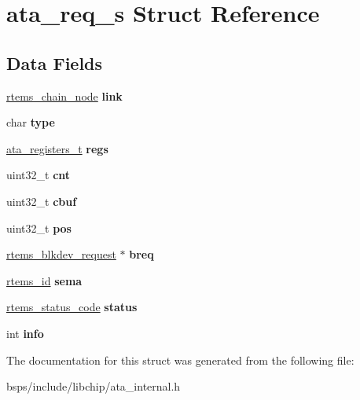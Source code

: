 \hypertarget{structata__req__s}{}\section{ata\+\_\+req\+\_\+s Struct Reference}
\label{structata__req__s}
\subsection*{Data Fields}
\begin{DoxyCompactItemize}
\item 
\mbox{\label{structata__req__s_a9c1376413aa6285985463942da6f8c6d}} 
\mbox{\hyperlink{structChain__Node__struct}{rtems\+\_\+chain\+\_\+node}} {\bfseries link}
\item 
\mbox{\label{structata__req__s_a2b886768a599d0532f39f85760dae916}} 
char {\bfseries type}
\item 
\mbox{\label{structata__req__s_a1e6e45529217819b26f2bcf57f29d4d8}} 
\mbox{\hyperlink{structata__registers__s}{ata\+\_\+registers\+\_\+t}} {\bfseries regs}
\item 
\mbox{\label{structata__req__s_a87adefa62037ac018d1dcf1d7bd6c795}} 
uint32\+\_\+t {\bfseries cnt}
\item 
\mbox{\label{structata__req__s_aa684a88038253167dcccb1d795270494}} 
uint32\+\_\+t {\bfseries cbuf}
\item 
\mbox{\label{structata__req__s_a8a3b264393a3d2b6f222d6ae23d9f139}} 
uint32\+\_\+t {\bfseries pos}
\item 
\mbox{\label{structata__req__s_a0e4e3dff70555be32dcbac4c920af9eb}} 
\mbox{\hyperlink{structrtems__blkdev__request}{rtems\+\_\+blkdev\+\_\+request}} $\ast$ {\bfseries breq}
\item 
\mbox{\label{structata__req__s_a8778ee4164c59cbf661b672bc98f1365}} 
\mbox{\hyperlink{group__ClassicTasks_gab20892b814dced7dd4e5b9bf42becd57}{rtems\+\_\+id}} {\bfseries sema}
\item 
\mbox{\label{structata__req__s_ac6d38b4e431196d7528d3ca64eade257}} 
\mbox{\hyperlink{group__ClassicStatus_ga545d41846817eaba6143d52ee4d9e9fe}{rtems\+\_\+status\+\_\+code}} {\bfseries status}
\item 
\mbox{\label{structata__req__s_acb52211b61f98f6eb2143589c0649b47}} 
int {\bfseries info}
\end{DoxyCompactItemize}


The documentation for this struct was generated from the following file\+:\begin{DoxyCompactItemize}
\item 
bsps/include/libchip/ata\+\_\+internal.\+h\end{DoxyCompactItemize}
